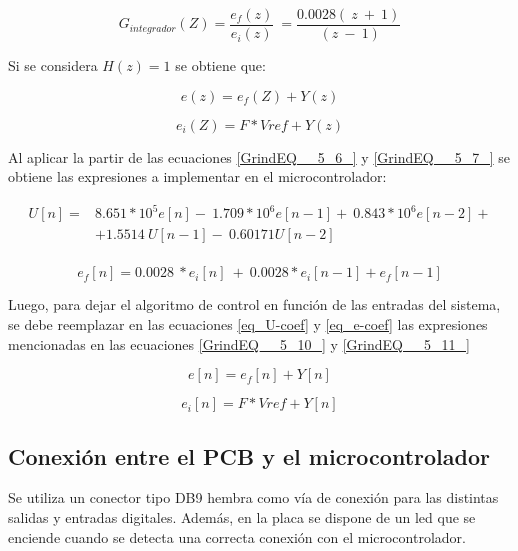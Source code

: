 \begin{equation} \label{GrindEQ__5_7_} 
	G_{integrador}(Z)=\frac{e_f(z)}{e_i(z)}\ =\frac{0.0028(\ z\ +\ 1)}{\ (z\ -\ 1)} 
\end{equation} 

\noindent Si se considera $H(z)=1$ se obtiene que:

\begin{equation} \label{GrindEQ__5_39_} 
	e(z)=e_f(Z)+Y(z) 
\end{equation} 

\begin{equation} \label{GrindEQ__5_40_} 
	e_i(Z)=F*Vref+Y(z) 
\end{equation} 


\noindent Al aplicar la partir de las ecuaciones \ref{GrindEQ__5_6_} y \ref{GrindEQ__5_7_} se obtiene las expresiones a implementar en el microcontrolador:

\begin{equation} 
	\begin{aligned}\label{eq_U-coef}
	U[n]=&8.651*10^5e[n]-\ 1.709*10^6e[n-1]+\ 0.843*10^6e[n-2]+\\
		 &+1.5514\ U[n-1]-\ 0.60171U[n-2]\\ 
	\end{aligned}
\end{equation}

\begin{equation} \label{eq_e-coef} 
	e_f[n]=0.0028{\ *e}_i[n]\ +\ {0.0028*e}_i[n-1]+e_f[n-1] 
\end{equation} 


\noindent Luego, para dejar el algoritmo de control en funci\'{o}n de las entradas del sistema, se debe reemplazar en las ecuaciones \ref{eq_U-coef} y \ref{eq_e-coef} las expresiones mencionadas en las ecuaciones \ref{GrindEQ__5_10_} y \ref{GrindEQ__5_11_}

\begin{equation} \label{GrindEQ__5_10_} 
	e[n]=e_f[n]+Y[n] 
\end{equation} 

\begin{equation} \label{GrindEQ__5_11_} 
	e_i[n]=F*Vref+Y[n] 
\end{equation} 

\subsection{Conexi\'{o}n entre el PCB y el microcontrolador}

\noindent Se utiliza un conector tipo DB9 hembra como v\'{i}a de conexi\'{o}n para las distintas salidas y entradas digitales. Adem\'{a}s, en la placa se dispone de un led que se enciende cuando  se detecta una correcta conexi\'{o}n con el microcontrolador.







